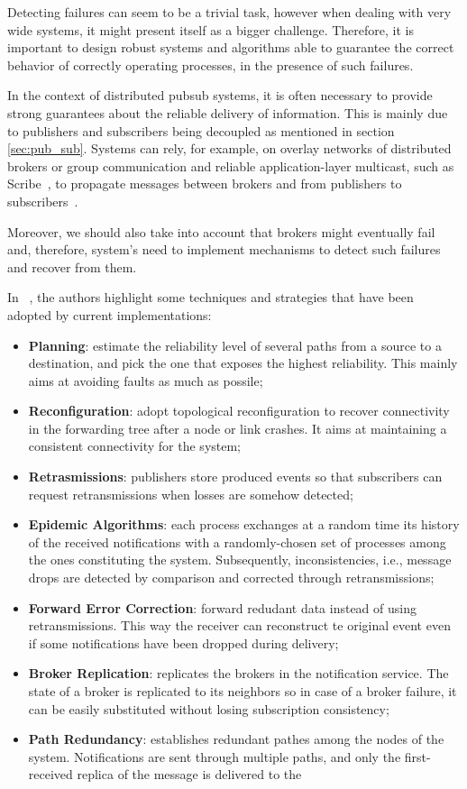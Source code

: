 Detecting failures can seem to be a trivial task, however when dealing with very wide systems, it might present itself as a bigger challenge. Therefore, it is important to design robust systems and algorithms able to guarantee the correct behavior of correctly operating processes, in the presence of such failures. 

In the context of distributed \gls{pubsub} systems, it is often necessary to provide strong guarantees about the reliable delivery of information. This is mainly due to publishers and subscribers being decoupled as mentioned in section \ref{sec:pub_sub}. Systems can rely, for example, on overlay networks of distributed brokers or group communication and reliable application-layer multicast, such as Scribe~\cite{scribe}, to propagate messages between brokers and from publishers to subscribers~\cite{faces-of-pub-sub}.

Moreover, we should also take into account that brokers might eventually fail and, therefore, system's need to implement mechanisms to detect such failures and recover from them.

In ~\cite{tutorial-on-reliability-in-pubsub}, the authors highlight some techniques and strategies that have been adopted by current implementations:

\begin{itemize}
  \item \textbf{Planning}: estimate the reliability level of several paths from a source to a destination, and pick the one that exposes the highest reliability. This mainly aims at avoiding faults as much as possile;
  \item \textbf{Reconfiguration}: adopt topological reconfiguration to recover connectivity in the forwarding tree after a node or link crashes. It aims at maintaining a consistent connectivity for the system;
  \item \textbf{Retrasmissions}: publishers store produced events so that subscribers can request retransmissions when losses are somehow detected;
  \item \textbf{Epidemic Algorithms}: each process exchanges at a random time its history of the received notifications with a randomly-chosen set of processes among the ones constituting the system. Subsequently, inconsistencies, i.e., message drops are detected by comparison and corrected through retransmissions;
  \item \textbf{Forward Error Correction}: forward redudant data instead of using retransmissions. This way the receiver can reconstruct te original event even if some notifications have been dropped during delivery;
  \item \textbf{Broker Replication}: replicates the brokers in the notification service. The state of a broker is replicated to its neighbors so in case of a broker failure, it can be easily substituted without losing subscription consistency;
  \item \textbf{Path Redundancy}: establishes redundant pathes among the nodes of the system. Notifications are sent through multiple paths, and only the first-received replica of the message is delivered to the   
\end{itemize}

